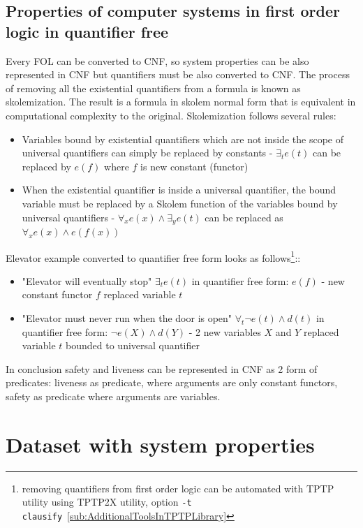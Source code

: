 \subsection{Properties of computer systems in first order logic in quantifier free}

Every \gls{FOL} can be converted to \gls{CNF}, so system properties can be also represented in \gls{CNF} but quantifiers must be also converted to CNF. The process of removing all the existential quantifiers from a formula is known as skolemization. The result is a formula in skolem normal form that is equivalent in computational complexity to the original. Skolemization follows several rules:


\begin{itemize}
  \item Variables bound by existential quantifiers which are not inside the scope of universal quantifiers can simply be replaced by constants - $\exists_t e(t)$ can be replaced by $e(f)$ where $f$ is new constant (functor)
  \item When the existential quantifier is inside a universal quantifier, the bound variable must be replaced by a Skolem function of the variables bound by universal quantifiers - $\forall_x  e(x) \land \exists_y e(t)$ can be replaced as $\forall_x e(x) \land e(f(x))$ 
\end{itemize}


Elevator example converted to quantifier free form looks as follows\footnote{removing quantifiers from first order logic can be automated with TPTP utility using TPTP2X utility, option \texttt{-t clausify}~\ref{sub:AdditionalToolsInTPTPLibrary} }::
\begin{itemize}
  \item "Elevator will eventually stop" $\exists_t e(t)$ in quantifier free form: $e(f)$ - new constant functor $f$ replaced variable $t$
  \item "Elevator must never run when the door is open" $\forall_t \neg e(t) \land d(t)$ in quantifier free form: $\neg e(X) \land d(Y)$ - 2 new variables $X$ and $Y$ replaced variable $t$ bounded to universal quantifier
\end{itemize}

In conclusion safety and liveness can be represented in CNF as 2 form of predicates: liveness as predicate, where arguments are only constant functors, safety as predicate where arguments are variables.

\section{Dataset with system properties}

